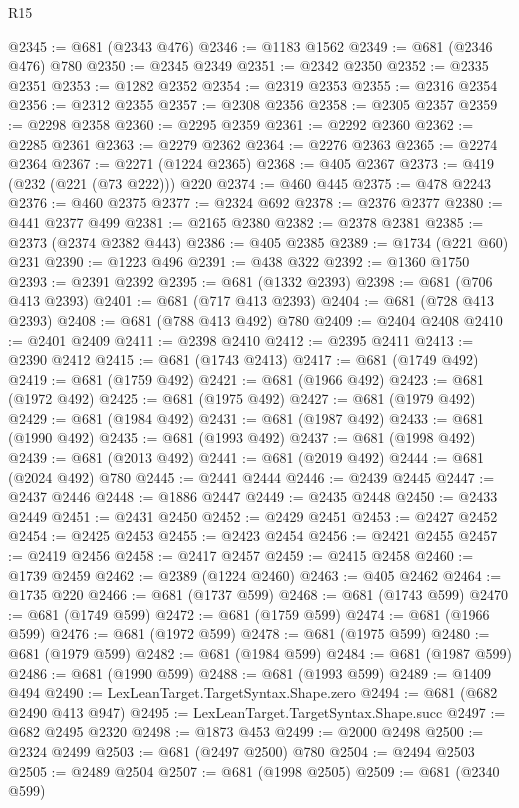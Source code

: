 \begin{lexlean}{R15}
\begin{coremodule}
@2345 := @681 (@2343 @476)
@2346 := @1183 @1562
@2349 := @681 (@2346 @476) @780
@2350 := @2345 @2349
@2351 := @2342 @2350
@2352 := @2335 @2351
@2353 := @1282 @2352
@2354 := @2319 @2353
@2355 := @2316 @2354
@2356 := @2312 @2355
@2357 := @2308 @2356
@2358 := @2305 @2357
@2359 := @2298 @2358
@2360 := @2295 @2359
@2361 := @2292 @2360
@2362 := @2285 @2361
@2363 := @2279 @2362
@2364 := @2276 @2363
@2365 := @2274 @2364
@2367 := @2271 (@1224 @2365)
@2368 := @405 @2367
@2373 := @419 (@232 (@221 (@73 @222))) @220
@2374 := @460 @445
@2375 := @478 @2243
@2376 := @460 @2375
@2377 := @2324 @692
@2378 := @2376 @2377
@2380 := @441 @2377 @499
@2381 := @2165 @2380
@2382 := @2378 @2381
@2385 := @2373 (@2374 @2382 @443)
@2386 := @405 @2385
@2389 := @1734 (@221 @60) @231
@2390 := @1223 @496
@2391 := @438 @322
@2392 := @1360 @1750
@2393 := @2391 @2392
@2395 := @681 (@1332 @2393)
@2398 := @681 (@706 @413 @2393)
@2401 := @681 (@717 @413 @2393)
@2404 := @681 (@728 @413 @2393)
@2408 := @681 (@788 @413 @492) @780
@2409 := @2404 @2408
@2410 := @2401 @2409
@2411 := @2398 @2410
@2412 := @2395 @2411
@2413 := @2390 @2412
@2415 := @681 (@1743 @2413)
@2417 := @681 (@1749 @492)
@2419 := @681 (@1759 @492)
@2421 := @681 (@1966 @492)
@2423 := @681 (@1972 @492)
@2425 := @681 (@1975 @492)
@2427 := @681 (@1979 @492)
@2429 := @681 (@1984 @492)
@2431 := @681 (@1987 @492)
@2433 := @681 (@1990 @492)
@2435 := @681 (@1993 @492)
@2437 := @681 (@1998 @492)
@2439 := @681 (@2013 @492)
@2441 := @681 (@2019 @492)
@2444 := @681 (@2024 @492) @780
@2445 := @2441 @2444
@2446 := @2439 @2445
@2447 := @2437 @2446
@2448 := @1886 @2447
@2449 := @2435 @2448
@2450 := @2433 @2449
@2451 := @2431 @2450
@2452 := @2429 @2451
@2453 := @2427 @2452
@2454 := @2425 @2453
@2455 := @2423 @2454
@2456 := @2421 @2455
@2457 := @2419 @2456
@2458 := @2417 @2457
@2459 := @2415 @2458
@2460 := @1739 @2459
@2462 := @2389 (@1224 @2460)
@2463 := @405 @2462
@2464 := @1735 @220
@2466 := @681 (@1737 @599)
@2468 := @681 (@1743 @599)
@2470 := @681 (@1749 @599)
@2472 := @681 (@1759 @599)
@2474 := @681 (@1966 @599)
@2476 := @681 (@1972 @599)
@2478 := @681 (@1975 @599)
@2480 := @681 (@1979 @599)
@2482 := @681 (@1984 @599)
@2484 := @681 (@1987 @599)
@2486 := @681 (@1990 @599)
@2488 := @681 (@1993 @599)
@2489 := @1409 @494
@2490 := LexLeanTarget.TargetSyntax.Shape.zero
@2494 := @681 (@682 @2490 @413 @947)
@2495 := LexLeanTarget.TargetSyntax.Shape.succ
@2497 := @682 @2495 @2320
@2498 := @1873 @453
@2499 := @2000 @2498
@2500 := @2324 @2499
@2503 := @681 (@2497 @2500) @780
@2504 := @2494 @2503
@2505 := @2489 @2504
@2507 := @681 (@1998 @2505)
@2509 := @681 (@2340 @599)

\end{coremodule}
\end{lexlean}
